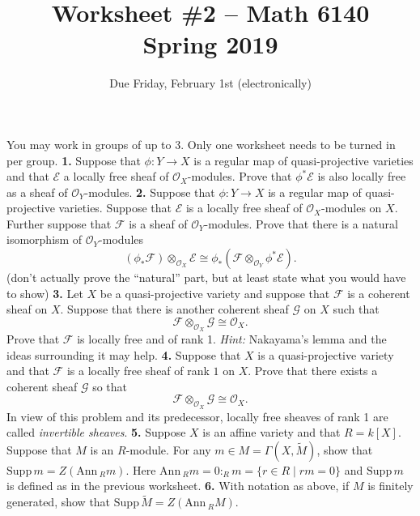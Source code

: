 \documentclass[11pt]{amsart}
\theoremstyle{theorem}
\renewcommand{\O}{\mathcal O}
\renewcommand{\to}[1][]{\xrightarrow{\ #1\ }}
\newcommand{\Supp}{\mathrm{Supp}\,}
\newcommand{\Ann}{\mathrm{Ann}\,}
\newcommand{\cE}{\mathcal{E}}
\newcommand{\cF}{\mathcal{F}}
\newcommand{\cG}{\mathcal{G}}
\newcommand{\cO}{\mathcal{O}}
\begin{document}
\title{Worksheet \#2 -- Math 6140\\Spring 2019}
\author{Due Friday, February 1st (electronically)}

\maketitle
You may work in groups of up to 3.  Only one worksheet needs to be turned in per group.
\vskip 9pt
\noindent
{\bf 1.}  Suppose that $\phi : Y \to X$ is a regular map of quasi-projective varieties and that $\cE$ a locally free sheaf of $\O_X$-modules.  Prove that $\phi^* \cE$ is also locally free as a sheaf of $\O_Y$-modules.
\vskip 200pt
\noindent
{\bf 2.}  Suppose that $\phi : Y \to X$ is a regular map of quasi-projective varieties.  Suppose that $\cE$ is a locally free sheaf of $\O_X$-modules on $X$.  Further suppose that $\cF$ is a sheaf of $\O_Y$-modules.  Prove that there is a natural isomorphism of $\O_Y$-modules
\[
(\phi_* \cF) \otimes_{\cO_X} \cE \cong \phi_* (\cF  \otimes_{\cO_Y} \phi^* \cE).
\]
(don't actually prove the ``natural'' part, but at least state what you would have to show)
\newpage
\noindent
{\bf 3.}  Let $X$ be a quasi-projective variety and suppose that $\cF$ is a coherent sheaf on $X$.  Suppose that there is another coherent sheaf $\cG$ on $X$ such that
\[
\cF \otimes_{\cO_X} \cG \cong \cO_X.
\]
Prove that $\cF$ is locally free and of rank 1.
\vskip 3pt
\emph{Hint:} Nakayama's lemma and the ideas surrounding it may help.
\vskip 250pt
\noindent
{\bf 4.}  Suppose that $X$ is a quasi-projective variety and that $\cF$ is a locally free sheaf of rank $1$ on $X$.  Prove that there exists a coherent sheaf $\cG$ so that
\[
\cF \otimes_{\cO_X} \cG \cong \cO_X.
\]
In view of this problem and its predecessor, locally free sheaves of rank 1 are called \emph{invertible sheaves}.
\newpage
\noindent
{\bf 5.} Suppose $X$ is an affine variety and that $R = k[X]$.  Suppose that $M$ is an $R$-module.  For any $m \in M = \Gamma(X, \widetilde{M})$, show that $\Supp m = Z(\Ann_R m)$.  Here $\Ann_R m = 0 :_R m = \{r \in R \;|\; rm = 0 \}$ and $\Supp m$ is defined as in the previous worksheet.
\vskip 250pt
\noindent
{\bf 6.}  With notation as above, if $M$ is finitely generated, show that $\Supp \widetilde M = Z(\Ann_R M)$.
\end{document}
